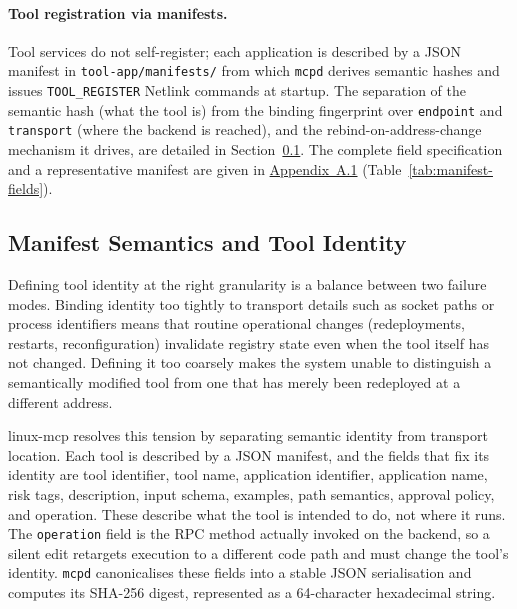 \paragraph{Tool registration via manifests.}
Tool services do not self-register; each application is described by a JSON manifest in \texttt{tool-app/\allowbreak manifests/} from which \texttt{mcpd} derives semantic hashes and issues \texttt{TOOL\_\allowbreak REGISTER} Netlink commands at startup.
The separation of the semantic hash (what the tool is) from the binding fingerprint over \texttt{endpoint} and \texttt{transport} (where the backend is reached), and the rebind-on-address-change mechanism it drives, are detailed in Section~\ref{sec:manifest-semantics}.
The complete field specification and a representative manifest are given in \hyperref[sec:appendix-protocols]{Appendix~A.1} (Table~\ref{tab:manifest-fields}).


\subsection{Manifest Semantics and Tool Identity}
\label{sec:manifest-semantics}

Defining tool identity at the right granularity is a balance between two failure modes. Binding identity too tightly to transport details such as socket paths or process identifiers means that routine operational changes (redeployments, restarts, reconfiguration) invalidate registry state even when the tool itself has not changed. Defining it too coarsely makes the system unable to distinguish a semantically modified tool from one that has merely been redeployed at a different address.

linux-mcp resolves this tension by separating semantic identity from transport location.
Each tool is described by a JSON manifest, and the fields that fix its identity are tool identifier, tool name, application identifier, application name, risk tags, description, input schema, examples, path semantics, approval policy, and operation. These describe what the tool is intended to do, not where it runs.
The \texttt{operation} field is the RPC method actually invoked on the backend, so a silent edit retargets execution to a different code path and must change the tool's identity.
\texttt{mcpd} canonicalises these fields into a stable JSON serialisation and computes its SHA-256 digest, represented as a 64-character hexadecimal string.


